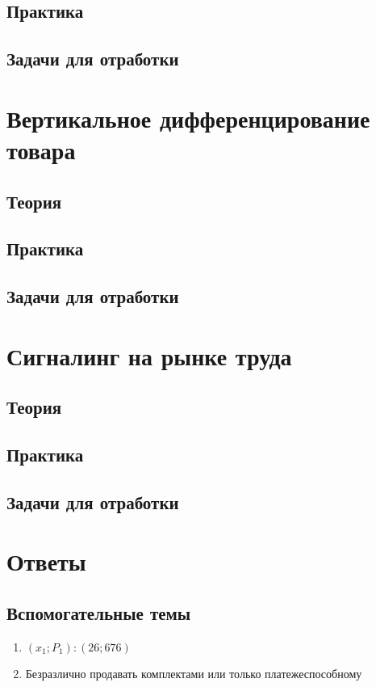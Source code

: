 \subsection{Практика}
\subsection{Задачи для отработки}

\section{Вертикальное дифференцирование товара}
\subsection{Теория}
\subsection{Практика}
\subsection{Задачи для отработки}

\section{Сигналинг на рынке труда}
\subsection{Теория}
\subsection{Практика}
\subsection{Задачи для отработки}

\section{Ответы}
\subsection{Вспомогательные темы}
\begin{enumerate}
    \item $(x_1;P_1): (26;676)$
    \item Безразлично продавать комплектами или только платежеспособному
\end{enumerate}
